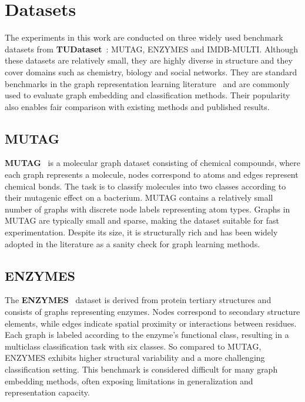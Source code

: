 \section{Datasets}

The experiments in this work are conducted on three widely used benchmark datasets from \textbf{TUDataset}~\cite{morris2020tudataset}: MUTAG, ENZYMES and IMDB-MULTI.
Although these datasets are relatively small, they are highly diverse in structure and 
they cover domains such as chemistry, biology and social networks.
They are standard benchmarks in the graph representation learning literature~\cite{narayanangraph2vec,tsitsulin2018netlsd,xu2019gin}
and are commonly used to evaluate graph embedding and classification methods.
Their popularity also enables fair comparison with existing methods and published results.

\subsection{MUTAG}
\textbf{MUTAG}~\cite{debnath1991mutag} is a molecular graph dataset consisting of chemical compounds, where each graph represents a molecule,
nodes correspond to atoms and edges represent chemical bonds.
The task is to classify molecules into two classes according to their mutagenic effect on a bacterium.
MUTAG contains a relatively small number of graphs with discrete node labels representing atom types.
Graphs in MUTAG are typically small and sparse, making the dataset suitable for fast experimentation.
Despite its size, it is structurally rich and has been widely adopted in the literature as a sanity check for graph learning methods.

\subsection{ENZYMES}
The \textbf{ENZYMES}~\cite{borgwardt2005graphkernels} dataset is derived from protein tertiary structures and consists of graphs representing enzymes.
Nodes correspond to secondary structure elements, while edges indicate spatial proximity or interactions between residues.
Each graph is labeled according to the enzyme's functional class, resulting in a multiclass classification task with six classes.
So compared to MUTAG, ENZYMES exhibits higher structural variability and a more challenging classification setting.
This benchmark is considered difficult for many graph embedding methods, often exposing limitations in generalization and representation capacity.

